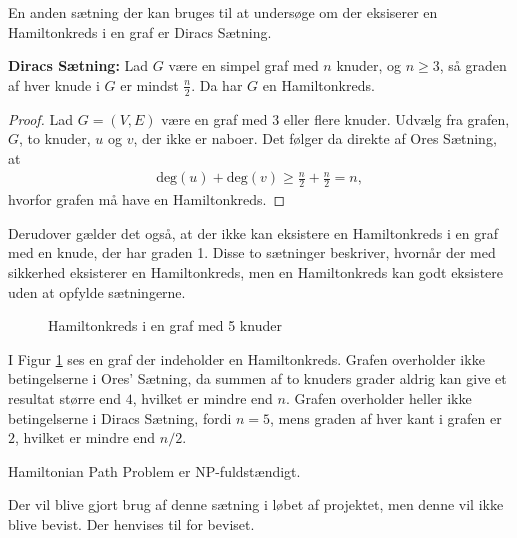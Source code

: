 En anden sætning der kan bruges til at undersøge om der eksiserer en Hamiltonkreds i en graf er Diracs Sætning. 

\begin{thm} \label{diracs_thm}
	\textbf{Diracs Sætning:} 
	Lad $G$ være en simpel graf med $n$ knuder, og $n\geq3$, så graden af hver knude i $G$ er mindst $\frac{n}{2}$. Da har $G$ en Hamiltonkreds.  
\end{thm}

\begin{proof}
	Lad $G=(V,E)$ være en graf med 3 eller flere knuder. Udvælg fra grafen, $G$, to knuder, $u$ og $v$, der ikke er naboer. Det følger da direkte af Ores Sætning, at
	\begin{align*}
	\textrm{deg}(u) + \textrm{deg}(v) \geq \frac{n}{2} + \frac{n}{2} = n,
	\end{align*}
	hvorfor grafen må have en Hamiltonkreds.
\end{proof}

Derudover gælder det også, at der ikke kan eksistere en Hamiltonkreds i en graf med en knude, der har graden 1. 
Disse to sætninger beskriver, hvornår der med sikkerhed eksisterer en Hamiltonkreds, men en Hamiltonkreds kan godt eksistere uden at opfylde sætningerne. 
	
	\begin{figure}[h]
	\centering
		
	\caption{Hamiltonkreds i en graf med 5 knuder}
	\label{pentagon}
	\end{figure}

\begin{exmp}
	I Figur \ref{pentagon} ses en graf der indeholder en Hamiltonkreds.
	Grafen overholder ikke betingelserne i Ores' Sætning, da summen af to knuders grader aldrig kan give et resultat større end $4$, hvilket er mindre end $n$.
	Grafen overholder heller ikke betingelserne i Diracs Sætning, fordi $n=5$, mens graden af hver kant i grafen er $2$, hvilket er mindre end $n/2$.
\end{exmp}

\begin{thm} \label{HPP}
	Hamiltonian Path Problem er NP-fuldstændigt. \citep{computers}
\end{thm}

Der vil blive gjort brug af denne sætning i løbet af projektet, men denne vil ikke blive bevist. 
Der henvises til \citep{computers} for beviset.
